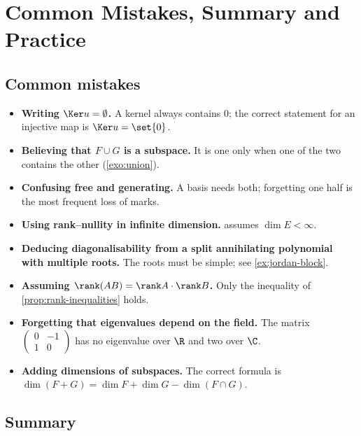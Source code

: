 \chapter{Common Mistakes, Summary and Practice}
\label{ch:summary}

\section{Common mistakes}

\begin{mistakes}
\begin{itemize}
  \item \textbf{Writing $\Ker u=\emptyset$.} A kernel always contains $0$; the
        correct statement for an injective map is $\Ker u=\set{0}$.
  \item \textbf{Believing that $F\cup G$ is a subspace.} It is one only when one
        of the two contains the other (\cref{exo:union}).
  \item \textbf{Confusing free and generating.} A basis needs both; forgetting one
        half is the most frequent loss of marks.
  \item \textbf{Using rank--nullity in infinite dimension.}
         assumes $\dim E<\infty$.
  \item \textbf{Deducing diagonalisability from a split annihilating polynomial
        with multiple roots.} The roots must be simple; see
        \cref{ex:jordan-block}.
  \item \textbf{Assuming $\rank(AB)=\rank A\cdot\rank B$.} Only the inequality
        of \cref{prop:rank-inequalities} holds.
  \item \textbf{Forgetting that eigenvalues depend on the field.} The matrix
        $\begin{pmatrix}0&-1\\1&0\end{pmatrix}$ has no eigenvalue over $\R$ and
        two over $\C$.
  \item \textbf{Adding dimensions of subspaces.} The correct formula is
        $\dim(F+G)=\dim F+\dim G-\dim(F\cap G)$.
\end{itemize}
\end{mistakes}

\section{Summary}

